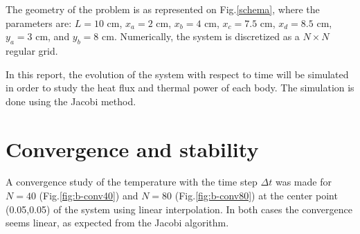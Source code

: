 \documentclass[a4paper,12pt,twoside]{article}
\begin{document}
The geometry of the problem is as represented on Fig.\ref{schema}, where the parameters are: $L=10$ cm, $x_a=2$ cm, $x_b=4$ cm, $x_c=7.5$ cm, $x_d=8.5$ cm, $y_a=3$ cm, and $y_b=8$ cm. Numerically, the system is discretized as a $N\times N$ regular grid.

In this report, the evolution of the system with respect to time will be simulated in order to study the heat flux and thermal power of each body. The simulation is done using the Jacobi method.


\section{Convergence and stability}

A convergence study of the temperature with the time step $\Delta t$ was made for $N=40$ (Fig.\ref{fig:b-conv40}) and $N=80$ (Fig.\ref{fig:b-conv80}) at the center point (0.05,0.05) of the system using linear interpolation. In both cases the convergence seems linear, as expected from the Jacobi algorithm. %
\end{document}
